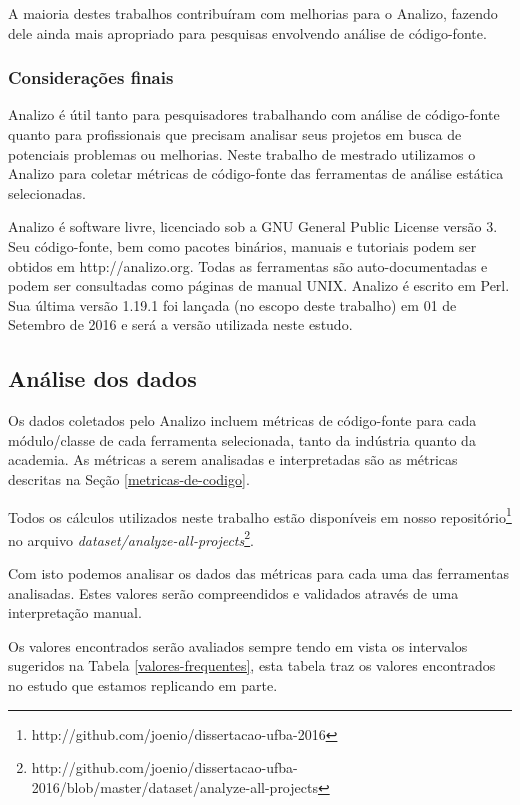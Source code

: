 A maioria destes trabalhos contribuíram com melhorias para o Analizo, fazendo
dele ainda mais apropriado para pesquisas envolvendo análise de código-fonte.

\subsubsection{Considerações finais}

Analizo é útil tanto para pesquisadores trabalhando com análise de código-fonte
quanto para profissionais que precisam analisar seus projetos em busca de
potenciais problemas ou melhorias. Neste trabalho de mestrado utilizamos o
Analizo para coletar métricas de código-fonte das ferramentas de análise
estática selecionadas.

Analizo é software livre, licenciado sob a GNU General Public License versão 3.
Seu código-fonte, bem como pacotes binários, manuais e tutoriais podem ser
obtidos em http://analizo.org. Todas as ferramentas são auto-documentadas e
podem ser consultadas como páginas de manual UNIX. Analizo é escrito em Perl.
Sua última versão 1.19.1 foi lançada (no escopo deste trabalho) em 01 de
Setembro de 2016 e será a versão utilizada neste estudo.

\subsection{Análise dos dados} \label{analise}

Os dados coletados pelo Analizo incluem métricas de código-fonte para cada módulo/classe de
cada ferramenta selecionada, tanto da indústria quanto da academia. As
métricas a serem analisadas e interpretadas são as métricas descritas na Seção
\ref{metricas-de-codigo}.

Todos os cálculos utilizados neste trabalho estão disponíveis em nosso
repositório\footnote{http://github.com/joenio/dissertacao-ufba-2016} no arquivo
{\em
dataset/analyze-all-projects}\footnote{http://github.com/joenio/dissertacao-ufba-2016/blob/master/dataset/analyze-all-projects}.

Com isto podemos analisar os dados das métricas para cada uma das ferramentas analisadas.
Estes valores serão compreendidos e validados através de uma interpretação manual.

Os valores encontrados serão avaliados sempre tendo em vista os intervalos
sugeridos na Tabela \ref{valores-frequentes}, esta tabela traz os valores encontrados
no estudo que estamos replicando em parte\cite{Meirelles2013}.

